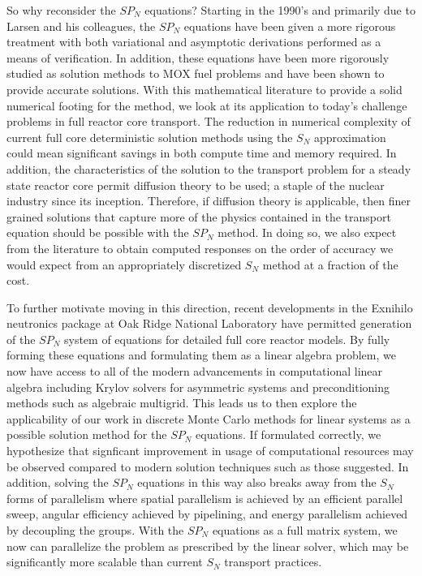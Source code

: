 \documentclass[letterpaper,12pt]{article}
\begin{document}
So why reconsider the $SP_N$ equations? Starting in the 1990's and
primarily due to Larsen and his colleagues, the $SP_N$ equations have
been given a more rigorous treatment with both variational and
asymptotic derivations performed as a means of verification. In
addition, these equations have been more rigorously studied as
solution methods to MOX fuel problems and have been shown to provide
accurate solutions. With this mathematical literature to provide a
solid numerical footing for the method, we look at its application to
today's challenge problems in full reactor core transport. The
reduction in numerical complexity of current full core deterministic
solution methods using the $S_N$ approximation could mean significant
savings in both compute time and memory required. In addition, the
characteristics of the solution to the transport problem for a steady
state reactor core permit diffusion theory to be used; a staple of the
nuclear industry since its inception. Therefore, if diffusion theory
is applicable, then finer grained solutions that capture more of the
physics contained in the transport equation should be possible with
the $SP_N$ method. In doing so, we also expect from the literature to
obtain computed responses on the order of accuracy we would expect
from an appropriately discretized $S_N$ method at a fraction of the
cost. 

To further motivate moving in this direction, recent developments in
the Exnihilo neutronics package at Oak Ridge National Laboratory have
permitted generation of the $SP_N$ system of equations for detailed
full core reactor models. By fully forming these equations and
formulating them as a linear algebra problem, we now have access to
all of the modern advancements in computational linear algebra
including Krylov solvers for asymmetric systems and preconditioning
methods such as algebraic multigrid. This leads us to then explore the
applicability of our work in discrete Monte Carlo methods for linear
systems as a possible solution method for the $SP_N$ equations. If
formulated correctly, we hypothesize that signficant improvement in
usage of computational resources may be observed compared to modern
solution techniques such as those suggested. In addition, solving the
$SP_N$ equations in this way also breaks away from the $S_N$ forms of
parallelism where spatial parallelism is achieved by an efficient
parallel sweep, angular efficiency achieved by pipelining, and energy
parallelism achieved by decoupling the groups. With the $SP_N$
equations as a full matrix system, we now can parallelize the problem
as prescribed by the linear solver, which may be significantly more
scalable than current $S_N$ transport practices.
\end{document}
